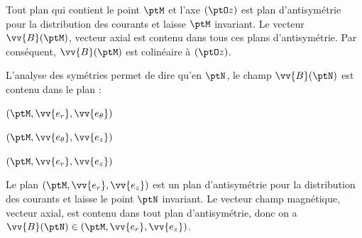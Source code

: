 \reponse{$\reponseC{}$}

\begin{corrigeNewpage}
Tout plan qui contient le point $\ptM$ et l'axe $(\ptO z)$ est plan d'antisymétrie pour la distribution des courants et laisse $\ptM$ invariant. Le vecteur $\vv{B}(\ptM)$, vecteur axial est contenu dans tous ces plans d'antisymétrie. Par conséquent, $\vv{B}(\ptM)$ est colinéaire à $(\ptO z)$.
\end{corrigeNewpage}




\begin{enonce}
L'analyse des symétries permet de dire qu'en $\ptN$, le champ $\vv{B}(\ptN)$ est contenu dans le plan : 
	\begin{listeQCM3Colonnes}
		\item $(\ptM, \vv{e_r}, \vv{e_\theta})$
		\item $(\ptM, \vv{e_\theta}, \vv{e_z})$
		\item $(\ptM, \vv{e_r}, \vv{e_z})$
	\end{listeQCM3Colonnes}
\bigskip
\end{enonce}

\reponse{$\reponseC{}$ }

\begin{corrige}
Le plan $(\ptM, \vv{e_r}, \vv{e_z})$ est un plan d'antisymétrie pour la distribution des courants et laisse le point $\ptN$ invariant. Le vecteur champ magnétique, vecteur axial, est contenu dans tout plan d'antisymétrie, donc on a $\vv{B}(\ptN) \in (\ptM, \vv{e_r}, \vv{e_z})$. 
\end{corrige}


\finEntrainement






